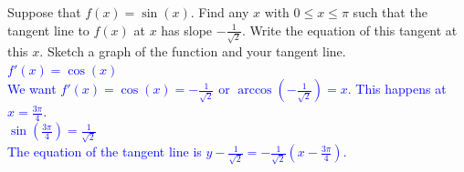 \documentclass{ximera}
\begin{document}
\begin{exercise}
    Suppose that $f(x)=\sin(x)$.  Find any $x$ with $0\leq x\leq \pi$ such that the tangent line to $f(x)$ at $x$ has slope $-\frac{1}{\sqrt{2}}$.  Write the equation of this tangent at this $x$. Sketch a graph of the function and your tangent line. \\
    \textcolor{blue}{$f'(x)=\cos(x)$\\
      We want $f'(x)=\cos(x)=-\frac{1}{\sqrt{2}}$ or $\arccos(-\frac{1}{\sqrt{2}})=x$.  This happens at $x=\frac{3\pi}{4}$. \\
      $\sin(\frac{3\pi}{4})=\frac{1}{\sqrt{2}}$\\
      The equation of the tangent line is $y-\frac{1}{\sqrt{2}}=-\frac{1}{\sqrt{2}}(x-\frac{3\pi}{4})$.}\\
      \begin{center}
      \end{center}
\end{exercise}
\end{document}
